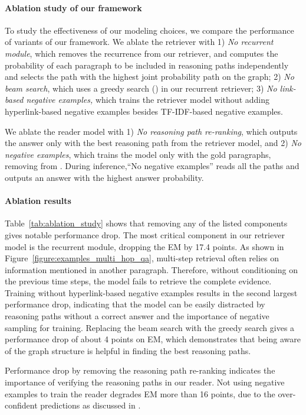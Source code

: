 \documentclass{article} \usepackage{iclr2020_conference,times}
\begin{document}
\vspace{-2mm}
\paragraph{Ablation study of our framework}
To study the effectiveness of our modeling choices, we compare the performance of variants of our framework.
We ablate the retriever with 1) {\it  No recurrent module}, which removes the recurrence from our retriever,
and computes the probability of each paragraph to be included in reasoning paths independently and selects the path with the highest joint probability path on the graph;
2) {\it No beam search}, which uses a greedy search () in our recurrent retriever;
3) {\it No  link-based negative examples,} which trains the retriever model without adding hyperlink-based negative examples besides TF-IDF-based negative examples.

We ablate the reader model with 1) {\it No reasoning path re-ranking}, which outputs the answer only with the best reasoning path from the retriever model, and 
2) {\it No negative examples}, which trains the model only with the gold paragraphs, removing   from . 
During inference,``No negative examples'' reads all the paths and outputs an answer with the highest answer probability.


\vspace{-3mm}\paragraph{Ablation results}
Table~\ref{tab:ablation_study} shows that removing any of the listed components gives notable performance drop.
The most critical component in our retriever model is the recurrent module, dropping the EM by 17.4 points. 
As shown in Figure~\ref{figure:examples_multi_hop_qa}, multi-step retrieval often relies on information mentioned in another paragraph. 
Therefore, without conditioning on the previous time steps, the model fails to retrieve the complete evidence.
Training without hyperlink-based negative examples results in the second largest performance drop, indicating that the model can be easily distracted by reasoning paths without a correct answer and the importance of negative sampling for training.
Replacing the beam search with the greedy search gives a performance drop of about 4 points on EM, which demonstrates that being aware of the graph structure is helpful in finding the best reasoning paths.

Performance drop by removing the reasoning path re-ranking indicates the importance of verifying the reasoning paths in our reader.
Not using negative examples to train the reader degrades EM more than 16 points, due to the over-confident predictions as discussed in \cite{clark-gardner-2018-simple}.
\end{document}
